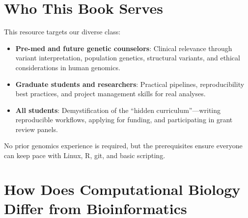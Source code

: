 \documentclass[
  letterpaper,
  DIV=11,
  numbers=noendperiod]{scrreprt}
\begin{document}
\section{Who This Book Serves}\label{who-this-book-serves}

This resource targets our diverse class:

\begin{itemize}
\item
  \textbf{Pre-med and future genetic counselors}: Clinical relevance
  through variant interpretation, population genetics, structural
  variants, and ethical considerations in human genomics.
\item
  \textbf{Graduate students and researchers}: Practical pipelines,
  reproducibility best practices, and project management skills for real
  analyses.
\item
  \textbf{All students}: Demystification of the ``hidden
  curriculum''---writing reproducible workflows, applying for funding,
  and participating in grant review panels.
\end{itemize}

No prior genomics experience is required, but the prerequisites ensure
everyone can keep pace with Linux, R, git, and basic scripting.

\section{How Does Computational Biology Differ from
Bioinformatics}\label{how-does-computational-biology-differ-from-bioinformatics}
\end{document}
